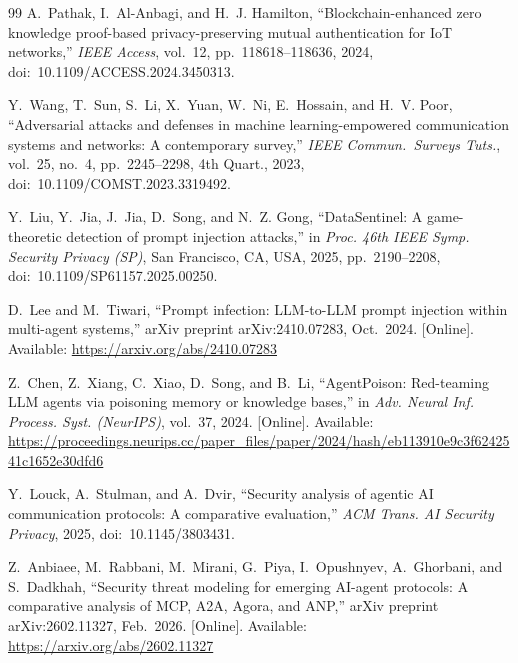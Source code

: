 \documentclass[conference]{IEEEtran}
\begin{document}
\begin{thebibliography}{99}
A.~Pathak, I.~Al-Anbagi, and H.~J. Hamilton,
``Blockchain-enhanced zero knowledge proof-based privacy-preserving
mutual authentication for IoT networks,''
\textit{IEEE Access}, vol.~12, pp.~118618--118636, 2024,
doi:~10.1109/ACCESS.2024.3450313.

Y.~Wang, T.~Sun, S.~Li, X.~Yuan, W.~Ni, E.~Hossain,
and H.~V. Poor,
``Adversarial attacks and defenses in machine learning-empowered
communication systems and networks: A contemporary survey,''
\textit{IEEE Commun.\ Surveys Tuts.}, vol.~25, no.~4,
pp.~2245--2298, 4th Quart., 2023,
doi:~10.1109/COMST.2023.3319492.

Y.~Liu, Y.~Jia, J.~Jia, D.~Song, and N.~Z. Gong,
``DataSentinel: A game-theoretic detection of prompt injection
attacks,''
in \textit{Proc. 46th IEEE Symp. Security Privacy (SP)},
San Francisco, CA, USA, 2025, pp.~2190--2208,
doi:~10.1109/SP61157.2025.00250.

D.~Lee and M.~Tiwari,
``Prompt infection: LLM-to-LLM prompt injection within multi-agent
systems,'' arXiv preprint arXiv:2410.07283, Oct.~2024. [Online].
Available: \url{https://arxiv.org/abs/2410.07283}

Z.~Chen, Z.~Xiang, C.~Xiao, D.~Song, and B.~Li,
``AgentPoison: Red-teaming LLM agents via poisoning memory or
knowledge bases,''
in \textit{Adv. Neural Inf. Process. Syst. (NeurIPS)}, vol.~37,
2024. [Online]. Available:
\url{https://proceedings.neurips.cc/paper_files/paper/2024/hash/eb113910e9c3f6242541c1652e30dfd6}

Y.~Louck, A.~Stulman, and A.~Dvir,
``Security analysis of agentic AI communication protocols:
A comparative evaluation,''
\textit{ACM Trans. AI Security Privacy}, 2025,
doi:~10.1145/3803431.

Z.~Anbiaee, M.~Rabbani, M.~Mirani, G.~Piya, I.~Opushnyev,
A.~Ghorbani, and S.~Dadkhah,
``Security threat modeling for emerging AI-agent protocols:
A comparative analysis of MCP, A2A, Agora, and ANP,''
arXiv preprint arXiv:2602.11327, Feb.~2026. [Online].
Available: \url{https://arxiv.org/abs/2602.11327}

\end{thebibliography}
\end{document}
